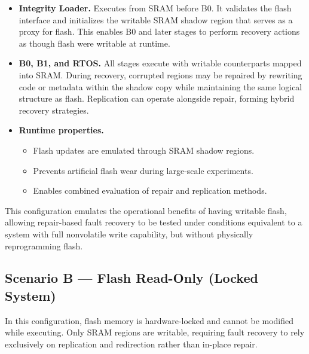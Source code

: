 \begin{itemize}
  \item \textbf{Integrity Loader.}
        Executes from SRAM before B0. It validates the flash interface and
        initializes the writable SRAM shadow region that serves as a proxy for
        flash. This enables B0 and later stages to perform recovery actions
        as though flash were writable at runtime.

  \item \textbf{B0, B1, and RTOS.}
        All stages execute with writable counterparts mapped into SRAM. During
        recovery, corrupted regions may be repaired by rewriting code or
        metadata within the shadow copy while maintaining the same logical
        structure as flash. Replication can operate alongside repair, forming
        hybrid recovery strategies.

  \item \textbf{Runtime properties.}
        \begin{itemize}
          \item Flash updates are emulated through SRAM shadow regions.
          \item Prevents artificial flash wear during large-scale experiments.
          \item Enables combined evaluation of repair and replication methods.
        \end{itemize}
\end{itemize}

This configuration emulates the operational benefits of having writable flash,
allowing repair-based fault recovery to be tested under conditions equivalent
to a system with full nonvolatile write capability, but without physically
reprogramming flash.


\subsection{Scenario B — Flash Read-Only (Locked System)}
\label{sec:scenario-b}

In this configuration, flash memory is hardware-locked and cannot be modified
while executing. Only SRAM regions are writable, requiring fault recovery to
rely exclusively on replication and redirection rather than in-place repair.

